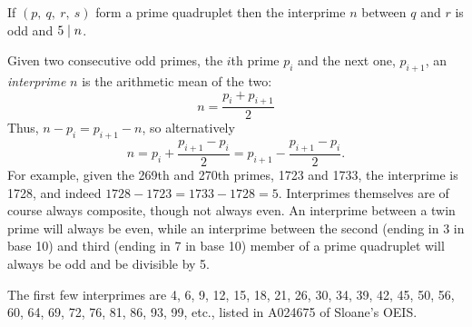 \documentclass[12pt]{article}
\begin{document}
\begin{cnl}
\begin{theorem}[Prop2]
If $(p,\ q,\ r,\ s)$ form a prime quadruplet then the 
interprime $n$ between $q$ and $r$ is odd and ${5}\mathrel{|}{n}$.
\end{theorem}

\begin{remark}
Given two consecutive odd primes, the $i$th prime $p_i$ and
 the next one, $p_{i + 1}$, an {\em interprime} $n$ is the
 arithmetic mean of the two: $$n = \frac{p_i + p_{i + 1}}{2}$$ 
Thus, $n - p_i = p_{i + 1} - n$, so alternatively $$n = p_i + 
\frac{p_{i + 1} - p_i}{2} = p_{i + 1} - \frac{p_{i + 1} 
- p_i}{2}.$$ For example, given the 269th and 270th primes, 
1723 and 1733, the interprime is 1728, and indeed 
$1728 - 1723 = 1733 - 1728 = 5$. Interprimes themselves 
are of course always composite, though not always even. 
An interprime between a twin prime will always be even, while 
an interprime between the second (ending in 3 in base 10) 
and third (ending in 7 in base 10) member of a prime quadruplet
 will always be odd and be divisible by 5.

The first few interprimes are 4, 6, 9, 12, 15, 18, 21, 26, 30, 
34, 39, 42, 45, 50, 56, 60, 64, 69, 72, 76, 81, 86, 93, 99, etc., 
listed in A024675 of Sloane's OEIS.
\end{remark}

\end{cnl}
\end{document}

